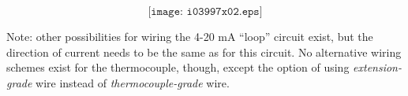





$$\texttt{[image: i03997x02.eps]}$$

Note: other possibilities for wiring the 4-20 mA ``loop'' circuit exist, but the direction of current needs to be the same as for this circuit.  No alternative wiring schemes exist for the thermocouple, though, except the option of using {\it extension-grade} wire instead of {\it thermocouple-grade} wire.





